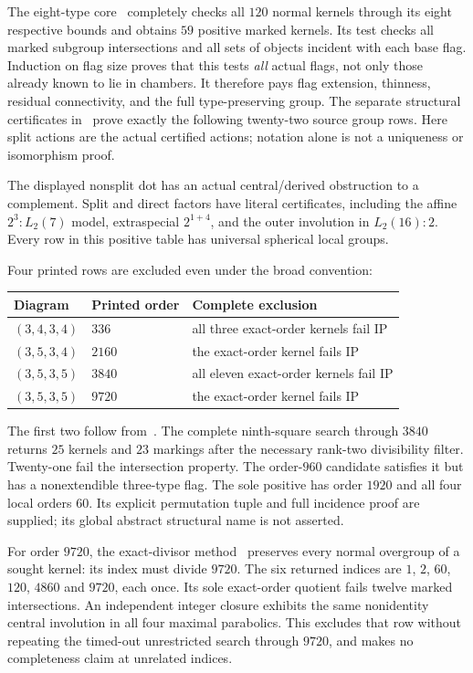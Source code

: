 \documentclass[11pt,a4paper]{article}
\begin{document}
The eight-type core~\cite{core} completely checks all $120$ normal kernels
through its eight respective bounds and obtains $59$ positive marked
kernels. Its test checks all marked subgroup intersections and all sets of
objects incident with each base flag. Induction on flag size proves that
this tests \emph{all} actual flags, not only those already known to lie in
chambers. It therefore pays flag extension, thinness, residual connectivity,
and the full type-preserving group. The separate structural certificates
in~\cite{names} prove exactly the following twenty-two source group rows.
Here split actions are the actual certified actions; notation alone is not
a uniqueness or isomorphism proof.

The displayed nonsplit dot has an actual central/derived obstruction to a
complement. Split and direct factors have literal certificates, including
the affine $2^3:L_2(7)$ model, extraspecial $2^{1+4}$, and the outer
involution in $L_2(16):2$. Every row in this positive table has universal
spherical local groups.

Four printed rows are excluded even under the broad convention:
\begin{center}
\begin{tabular}{lll}\toprule
Diagram & Printed order & Complete exclusion\\\midrule
$(3,4,3,4)$&$336$&all three exact-order kernels fail IP\\
$(3,5,3,4)$&$2160$&the exact-order kernel fails IP\\
$(3,5,3,5)$&$3840$&all eleven exact-order kernels fail IP\\
$(3,5,3,5)$&$9720$&the exact-order kernel fails IP\\\bottomrule
\end{tabular}
\end{center}
The first two follow from~\cite{core}. The complete ninth-square search
through $3840$~\cite{square} returns $25$ kernels and $23$ markings after
the necessary rank-two divisibility filter. Twenty-one fail the intersection
property. The order-$960$ candidate satisfies it but has a nonextendible
three-type flag. The sole positive has order $1920$ and all four local
orders $60$. Its explicit permutation tuple and full incidence proof are
supplied; its global abstract structural name is not asserted.

For order $9720$, the exact-divisor method~\cite{divisor} preserves every
normal overgroup of a sought kernel: its index must divide $9720$.
The six returned indices are $1$, $2$, $60$, $120$, $4860$ and $9720$, each once.
Its sole exact-order quotient fails twelve marked intersections. An
independent integer closure exhibits the same nonidentity central
involution in all four maximal parabolics. This excludes that row without
repeating the timed-out unrestricted search through $9720$, and makes no
completeness claim at unrelated indices.
\end{document}
